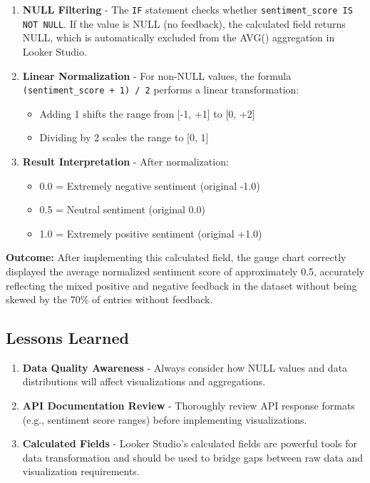 \documentclass[12pt,a4paper]{article}
\begin{document}
\begin{enumerate}
    \item \textbf{NULL Filtering} - The \texttt{IF} statement checks whether \texttt{sentiment\_score IS NOT NULL}. If the value is NULL (no feedback), the calculated field returns NULL, which is automatically excluded from the AVG() aggregation in Looker Studio.
    
    \item \textbf{Linear Normalization} - For non-NULL values, the formula \texttt{(sentiment\_score + 1) / 2} performs a linear transformation:
    \begin{itemize}
        \item Adding 1 shifts the range from [-1, +1] to [0, +2]
        \item Dividing by 2 scales the range to [0, 1]
    \end{itemize}
    
    \item \textbf{Result Interpretation} - After normalization:
    \begin{itemize}
        \item 0.0 = Extremely negative sentiment (original -1.0)
        \item 0.5 = Neutral sentiment (original 0.0)
        \item 1.0 = Extremely positive sentiment (original +1.0)
    \end{itemize}
\end{enumerate}

\textbf{Outcome:}
After implementing this calculated field, the gauge chart correctly displayed the average normalized sentiment score of approximately 0.5, accurately reflecting the mixed positive and negative feedback in the dataset without being skewed by the 70\% of entries without feedback.

\subsection{Lessons Learned}

\begin{enumerate}
    \item \textbf{Data Quality Awareness} - Always consider how NULL values and data distributions will affect visualizations and aggregations.
    
    \item \textbf{API Documentation Review} - Thoroughly review API response formats (e.g., sentiment score ranges) before implementing visualizations.
    
    \item \textbf{Calculated Fields} - Looker Studio's calculated fields are powerful tools for data transformation and should be used to bridge gaps between raw data and visualization requirements.
\end{enumerate}
\end{document}
